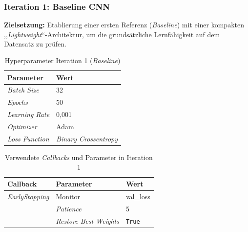 \documentclass[
    a4paper,        %
    11pt,           %
    ngerman,        %
    parskip=half,   %
    listof=totoc,   %
    bibliography=totoc %
]{scrartcl}
\begin{document}
\subsubsection{Iteration 1: Baseline CNN} \label{subsubsec:iter1}

\textbf{Zielsetzung:} Etablierung einer ersten Referenz (\textit{Baseline}) mit einer kompakten ,,\textit{Lightweight}``-Architektur, um die grundsätzliche Lernfähigkeit auf dem Datensatz zu prüfen.

\begin{table}[H]
    \centering
    \caption{Hyperparameter Iteration 1 (\textit{Baseline})}
    \label{tab:hyperparams_iter1}
    \begin{tabular}{ll}
        \toprule
        \textbf{Parameter} & \textbf{Wert} \\
        \midrule
        \textit{Batch Size} & 32 \\
        \textit{Epochs} & 50 \\
        \textit{Learning Rate} & 0,001 \\
        \textit{Optimizer} & Adam \\
        \textit{Loss Function} & \textit{Binary Crossentropy} \\
        \bottomrule
    \end{tabular}
\end{table}

\begin{table}[H]
    \centering
    \caption{Verwendete \textit{Callbacks} und Parameter in Iteration 1}
    \label{tab:callbacks_iter1}
    \begin{tabular}{lll}
        \toprule
        \textbf{Callback} & \textbf{Parameter} & \textbf{Wert} \\
        \midrule
        \textit{EarlyStopping}     & Monitor & val\_loss \\
                          & \textit{Patience} & 5 \\
                          & \textit{Restore Best Weights} & \texttt{True} \\
        \bottomrule
    \end{tabular}
\end{table}
\end{document}
